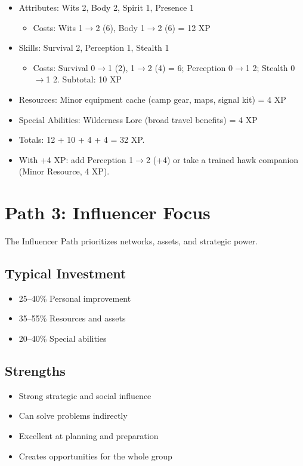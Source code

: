 \documentclass[11pt,twoside,openany]{book}
\begin{document}
\begin{itemize}
\item Attributes: Wits 2, Body 2, Spirit 1, Presence 1
\begin{itemize}
\item Costs: Wits 1$\rightarrow$2 (6), Body 1$\rightarrow$2 (6) = 12 XP
\end{itemize}
\item Skills: Survival 2, Perception 1, Stealth 1
\begin{itemize}
\item Costs: Survival 0$\rightarrow$1 (2), 1$\rightarrow$2 (4) = 6; Perception 0$\rightarrow$1 2; Stealth 0$\rightarrow$1 2. Subtotal: 10 XP
\end{itemize}
\item Resources: Minor equipment cache (camp gear, maps, signal kit) = 4 XP
\item Special Abilities: Wilderness Lore (broad travel benefits) = 4 XP
\item Totals: 12 + 10 + 4 + 4 = 32 XP.
\item With +4 XP: add Perception 1$\rightarrow$2 (+4) or take a trained hawk companion (Minor Resource, 4 XP).
\end{itemize}

\section*{Path 3: Influencer Focus} 

The Influencer Path prioritizes networks, assets, and strategic power.

\subsection*{Typical Investment}

\begin{itemize}
\item 25--40\% Personal improvement
\item 35--55\% Resources and assets
\item 20--40\% Special abilities
\end{itemize}

\subsection*{Strengths}

\begin{itemize}
\item Strong strategic and social influence
\item Can solve problems indirectly
\item Excellent at planning and preparation
\item Creates opportunities for the whole group
\end{itemize}
\end{document}
